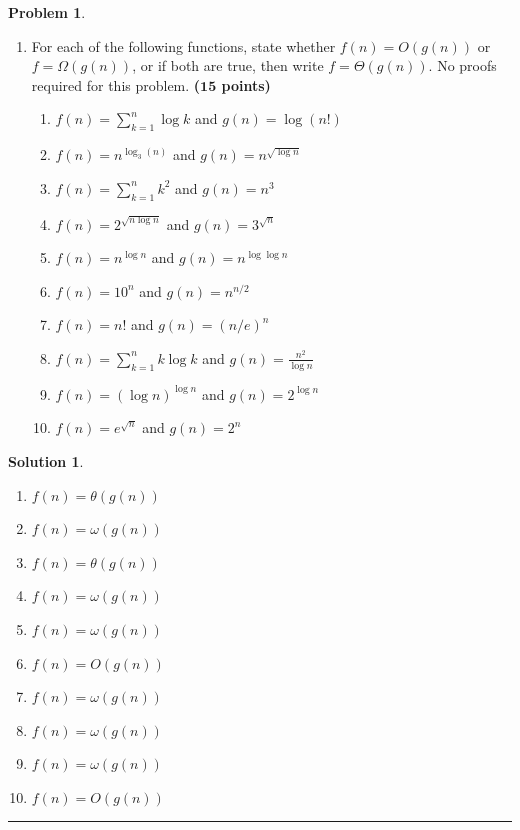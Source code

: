 \documentclass{article}
\theoremstyle{definition}
\newtheorem{problem}{Problem}
\def\fline{\rule{0.75\linewidth}{0.5pt}}
\newcommand{\finishline}{
  \begin{center}\fline
\end{center}}
\newtheorem*{solution*}{Solution}
\newenvironment{solution}{
\begin{solution*}}{{\finishline}
\end{solution*}}
\newcommand{\grade}[1]{\hfill{\textbf{($\mathbf{#1}$ points)}}}
\begin{document}
\begin{problem}
\begin{enumerate}
        \item[(c)] For each of the following functions, state whether $f(n) = O(g(n))$ or $f = \Omega(g(n))$, or if both are true, then write $f = \Theta(g(n))$. No proofs required for this problem.  \grade{15}
          \begin{enumerate}
            \item $f(n) = \sum_{k=1}^{n} \log k$ and $g(n) = \log(n!)$
            \item $f(n) = n^{\log_3(n)}$ and $g(n) = n^{\sqrt{\log n}}$
            \item $f(n) = \sum_{k=1}^{n} k^2$ and $g(n) = n^3$
            \item $f(n) = 2^{\sqrt{n \log n}}$ and $g(n) = 3^{\sqrt{n}}$
            \item $f(n) = n^{\log n}$ and $g(n) = n^{\log \log n}$
            \item $f(n) = 10^n$ and $g(n) = n^{n/2}$
            \item $f(n) = n!$ and $g(n) = (n/e)^n$
            \item $f(n) = \sum_{k=1}^{n} k \log k$ and $g(n) = \frac{n^2}{\log n}$
            \item $f(n) = (\log n)^{\log n}$ and $g(n) = 2^{\log n}$
            \item $f(n) = e^{\sqrt{n}}$ and $g(n) = 2^n$
          \end{enumerate}

      \end{enumerate}
    \end{problem}

    \begin{solution}
      \begin{enumerate}
        \item $f(n) = \theta(g(n))$
        \item $f(n) = \omega(g(n))$
        \item $f(n) = \theta(g(n))$
        \item $f(n) = \omega(g(n))$
        \item $f(n) = \omega(g(n))$
        \item $f(n) = O(g(n))$
        \item $f(n) = \omega(g(n))$
        \item $f(n) = \omega(g(n))$
        \item $f(n) = \omega(g(n))$
        \item $f(n) = O(g(n))$
      \end{enumerate}
    \end{solution}
\end{document}
